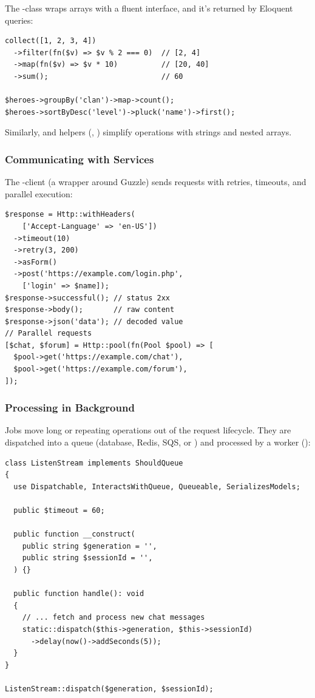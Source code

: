 The -class wraps arrays with a fluent interface, and it's returned by Eloquent
queries:

\begin{lstlisting}
collect([1, 2, 3, 4])
  ->filter(fn($v) => $v % 2 === 0)  // [2, 4]
  ->map(fn($v) => $v * 10)          // [20, 40]
  ->sum();                          // 60

$heroes->groupBy('clan')->map->count();
$heroes->sortByDesc('level')->pluck('name')->first();
\end{lstlisting}

\noindent Similarly,  and  helpers (,
) simplify operations with strings and nested arrays.


\subsubsection{Communicating with Services}

The -client (a wrapper around Guzzle) sends requests with retries, timeouts, and
parallel execution:

\begin{lstlisting}
$response = Http::withHeaders(
    ['Accept-Language' => 'en-US'])
  ->timeout(10)
  ->retry(3, 200)
  ->asForm()
  ->post('https://example.com/login.php',
    ['login' => $name]);
$response->successful(); // status 2xx
$response->body();       // raw content
$response->json('data'); // decoded value
// Parallel requests
[$chat, $forum] = Http::pool(fn(Pool $pool) => [
  $pool->get('https://example.com/chat'),
  $pool->get('https://example.com/forum'),
]);
\end{lstlisting}


\subsubsection{Processing in Background}

Jobs move long or repeating operations out of the request lifecycle. They are dispatched into a
queue (database, Redis, SQS, or ) and processed by a worker ():

\begin{lstlisting}
class ListenStream implements ShouldQueue
{
  use Dispatchable, InteractsWithQueue, Queueable, SerializesModels;

  public $timeout = 60;

  public function __construct(
    public string $generation = '',
    public string $sessionId = '',
  ) {}

  public function handle(): void
  {
    // ... fetch and process new chat messages
    static::dispatch($this->generation, $this->sessionId)
      ->delay(now()->addSeconds(5));
  }
}

ListenStream::dispatch($generation, $sessionId);
\end{lstlisting}

